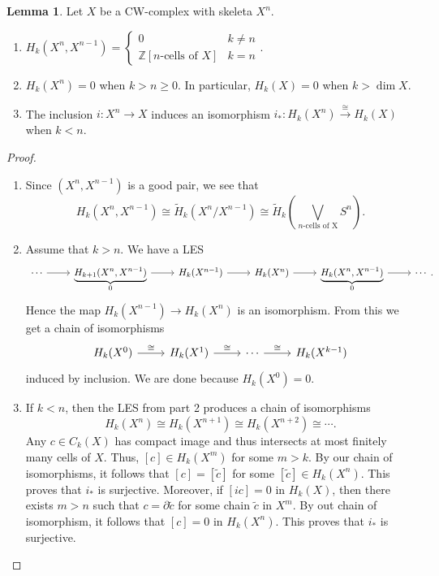 \documentclass[10pt,letterpaper,cm]{nupset}
\theoremstyle{definition}
\theoremstyle{theorem}
\newtheorem{lemma}[definition]{Lemma}
\theoremstyle{remark}
\newcommand{\Z}{\mathbb Z}
\newcommand{\1}{\mathbb{1}}
\newcommand{\0}{\vec 0}
\begin{document}
\begin{lemma}
Let $X$ be a CW-complex with skeleta $X^n$.
\begin{enumerate}
\item $H_k(X^n, X^{n-1}) =\begin{cases}  0 & k\ne n \\ \Z\left[n\text{-cells of } X\right] & k= n  \end{cases}$.
\item $H_k(X^n) =0$ when $k>n\geq 0$. In particular, $H_k(X) = 0$ when $k> \dim{X}$.
\item The inclusion $i: X^n \to X$ induces an isomorphism $i_{\ast} : H_k(X^n) \overset{\cong}{\longrightarrow} H_k(X)$ when $k<n$.
\end{enumerate}
\end{lemma}
\begin{proof} $ $
\begin{enumerate}
\item Since $\left(X^n, X^{n-1}\right)$ is a good pair, we see that $$H_k(X^n, X^{n-1}) \cong \widetilde{H}_k(X^n/X^{n-1}) \cong \widetilde{H}_k \left(\bigvee_{n\text{-cells of X}} S^n \right).$$
\item Assume that $k>n$. We have a LES 
\[
\begin{tikzcd}
\cdots \arrow[r] & {\underbrace{H_{k+1}(X^n, X^{n-1})}_{0}} \arrow[r] & H_k(X^{n-1}) \arrow[r] & H_k(X^n) \arrow[r] & {\underbrace{H_k(X^n, X^{n-1})}_{0}} \arrow[r] & \cdots
\end{tikzcd}
.\] Hence the map $H_k(X^{n-1}) \to H_k(X^n)$ is an isomorphism. From this we get a chain of isomorphisms
\[
\begin{tikzcd}
H_k(X^0) \arrow[r, "\cong"] & H_k(X^1) \arrow[r, "\cong"] & \cdots \arrow[r, "\cong"] & H_k(X^{k-1})
\end{tikzcd}
\] induced by inclusion.  We are done because $H_k(X^0)=0$.
\item If $k<n$, then the LES from part 2 produces a chain of isomorphisms 
\[
H_k(X^n) \cong H_k(X^{n+1}) \cong H_k(X^{n+2}) \cong \cdots
.\] Any $c \in C_k(X)$ has compact image and thus intersects at most finitely many cells of $X$. Thus, $[c] \in H_k(X^m)$ for some $m>k$. By our chain of isomorphisms, it follows that $[c] = \left[\tilde{c}\right]$ for some $\left[\tilde{c}\right]\in H_k(X^n)$. This proves that $i_{\ast}$ is surjective. Moreover, if $[ic] = 0$ in $H_k(X)$, then there exists $m >n$ such that $c = \partial{\tilde{c}}$ for some chain $\tilde{c}$ in $X^m$. By out chain of isomorphism, it follows that $[c]=0$ in $H_k(X^n)$. This proves that $i_{\ast}$ is surjective. 
\end{enumerate}
\end{proof}
\end{document}
